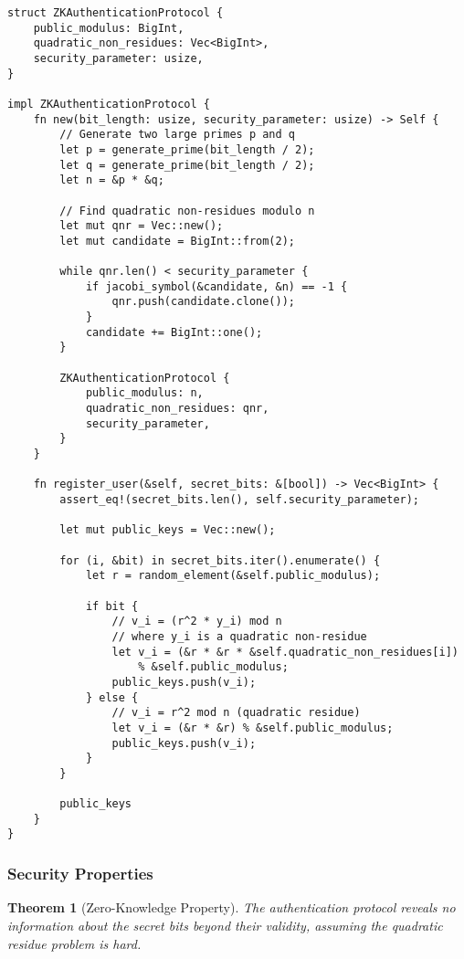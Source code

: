 \documentclass[12pt,a4paper]{article}
\newtheorem{theorem}{Theorem}[section]
\begin{document}
\begin{lstlisting}[caption={Zero-Knowledge Authentication Protocol}]
struct ZKAuthenticationProtocol {
    public_modulus: BigInt,
    quadratic_non_residues: Vec<BigInt>,
    security_parameter: usize,
}

impl ZKAuthenticationProtocol {
    fn new(bit_length: usize, security_parameter: usize) -> Self {
        // Generate two large primes p and q
        let p = generate_prime(bit_length / 2);
        let q = generate_prime(bit_length / 2);
        let n = &p * &q;
        
        // Find quadratic non-residues modulo n
        let mut qnr = Vec::new();
        let mut candidate = BigInt::from(2);
        
        while qnr.len() < security_parameter {
            if jacobi_symbol(&candidate, &n) == -1 {
                qnr.push(candidate.clone());
            }
            candidate += BigInt::one();
        }
        
        ZKAuthenticationProtocol {
            public_modulus: n,
            quadratic_non_residues: qnr,
            security_parameter,
        }
    }
    
    fn register_user(&self, secret_bits: &[bool]) -> Vec<BigInt> {
        assert_eq!(secret_bits.len(), self.security_parameter);
        
        let mut public_keys = Vec::new();
        
        for (i, &bit) in secret_bits.iter().enumerate() {
            let r = random_element(&self.public_modulus);
            
            if bit {
                // v_i = (r^2 * y_i) mod n 
                // where y_i is a quadratic non-residue
                let v_i = (&r * &r * &self.quadratic_non_residues[i]) 
                    % &self.public_modulus;
                public_keys.push(v_i);
            } else {
                // v_i = r^2 mod n (quadratic residue)
                let v_i = (&r * &r) % &self.public_modulus;
                public_keys.push(v_i);
            }
        }
        
        public_keys
    }
}
\end{lstlisting}

\subsubsection{Security Properties}

\begin{theorem}[Zero-Knowledge Property]
The authentication protocol reveals no information about the secret bits beyond their validity, assuming the quadratic residue problem is hard.
\end{theorem}
\end{document}
